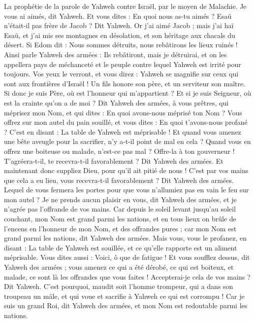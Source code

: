 \begin{multicols}{2}
\VerseOne{}La prophétie de la parole de Yahweh contre Israël, par le moyen de Malachie.
Je vous ai aimés, dit Yahweh. Et vous dites : En quoi nous as-tu aimés ? Esaü n'était-il pas frère de Jacob ? Dit Yahweh. Or j'ai aimé Jacob ;
mais j'ai haï Esaü, et j'ai mis ses montagnes en désolation, et son héritage aux chacals du désert.
Si Edom dit : Nous sommes détruits, nous rebâtirons les lieux ruinés ! Ainsi parle Yahweh des armées : Ils rebâtiront, mais je détruirai, et on les appellera pays de méchanceté et le peuple contre lequel Yahweh est irrité pour toujours.
Vos yeux le verront, et vous direz : Yahweh se magnifie sur ceux qui sont aux frontières d'Israël !
Un fils honore son père, et un serviteur son maître. Si donc je suis Père, où est l'honneur qui m'appartient ? Et si je suis Seigneur, où est la crainte qu'on a de moi ? Dit Yahweh des armées, à vous prêtres, qui méprisez mon Nom, et qui dites : En quoi avons-nous méprisé ton Nom ?
Vous offrez sur mon autel du pain souillé, et vous dites : En quoi t'avons-nous profané ? C'est en disant : La table de Yahweh est méprisable !
Et quand vous amenez une bête aveugle pour la sacrifier, n'y a-t-il point de mal en cela ? Quand vous en offrez une boiteuse ou malade, n'est-ce pas mal ? Offre-la à ton gouverneur ! T'agréera-t-il, te recevra-t-il favorablement ? Dit Yahweh des armées.
Et maintenant donc suppliez Dieu, pour qu'il ait pitié de nous ! C'est par vos mains que cela a eu lieu, vous recevra-t-il favorablement ? Dit Yahweh des armées.
Lequel de vous fermera les portes pour que vous n'allumiez pas en vain le feu sur mon autel ? Je ne prends aucun plaisir en vous, dit Yahweh des armées, et je n'agrée pas l'offrande de vos mains.
Car depuis le soleil levant jusqu'au soleil couchant, mon Nom est grand parmi les nations, et en tous lieux on brûle de l'encens en l'honneur de mon Nom, et des offrandes pures ; car mon Nom est grand parmi les nations, dit Yahweh des armées.
Mais vous, vous le profanez, en disant : La table de Yahweh est souillée, et ce qu'elle rapporte est un aliment méprisable.
Vous dites aussi : Voici, ô que de fatigue ! Et vous soufflez dessus, dit Yahweh des armées ; vous amenez ce qui a été dérobé, ce qui est boiteux, et malade, ce sont là les offrandes que vous faites ! Accepterai-je cela de vos mains ? Dit Yahweh.
C'est pourquoi, maudit soit l'homme trompeur, qui a dans son troupeau un mâle, et qui voue et sacrifie à Yahweh ce qui est corrompu ! Car je suis un grand Roi, dit Yahweh des armées, et mon Nom est redoutable parmi les nations.

\end{multicols}

